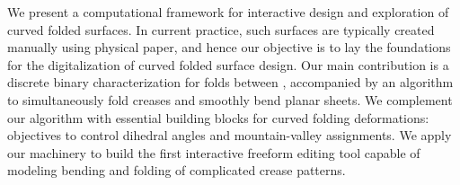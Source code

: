 We present a computational framework for interactive design and exploration of curved folded surfaces. In current practice, such surfaces are typically created manually using physical paper, and hence our objective is to lay the foundations for the digitalization of curved folded surface design. 
Our main contribution is a discrete binary characterization for folds between , accompanied by an algorithm to simultaneously fold creases and smoothly bend planar sheets. We complement our algorithm with essential building blocks for curved folding deformations: objectives to control dihedral angles and mountain-valley assignments. We apply our machinery to build the first interactive freeform editing tool capable of modeling bending and folding of complicated crease patterns.



